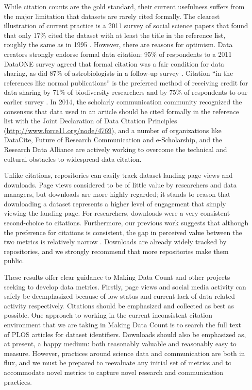 \documentclass[english]{article}
\begin{document}

While citation counts are the gold standard, their current usefulness suffers from the major limitation that datasets are rarely cited formally.
The clearest illustration of current practice is a 2011 survey of social science papers that found that only 17\% cited the dataset with at least the title in the reference list, roughly the same as in 1995 
\cite{sieber_not_1995, mooney_citing_2011}. 
However, there are reasons for optimism.
Data creators strongly endorse formal data citation: 95\% of respondents to a 2011 DataONE survey agreed that formal citation was a fair condition for data sharing, as did 87\% of astrobiologists in a follow-up survey \cite{tenopir_data_2011, aydinoglu_data_2014}. 
Citation ``in the references like normal publications'' is the preferred method of receiving credit for data sharing by 71\% of biodiversity researchers and by 75\% of respondents to our earlier survey \cite{enke_users_2012, kratz_researcher_2015}.
In 2014, the scholarly communication community recognized the consensus that data used in an article should be cited formally in the reference list with the Joint Declaration of Data Citation Principles (\url{http://www.force11.org/node/4769}), and a number of organizations like DataCite, Future of Research Communication and e-Scholarship, and the Research Data Alliance are actively working to overcome the technical and cultural obstacles to widespread data citation.

Unlike citations, repositories can easily track dataset landing page views and downloads.
Page views considered to be of little value by researchers and data managers, but downloads are more highly regarded; it stands to reason that downloading a dataset represents a higher level of engagement that simply viewing the landing page.
For researchers, downloads were a very consistent second-choice to citations.
Furthermore, our previous work suggests that although the preference for citations is consistent, the gap in perceived value between the two metrics is relatively narrow \cite{kratz_researcher_2015}.
Downloads are already widely tracked by repositories, and we strongly recommend that more repositories make them public.

These results offer clear guidance to Making Data Count and other projects seeking to develop data metrics.
Firstly, page views and social media activity can safely be deemphasized because of low status and current lack of data-related activity respectively.
Citations should be emphasized and collected as best as possible.
One approach to working in the current inconsistent citation environment that we are taking in Making Data Count is to search the full text of PLOS articles for dataset identifiers.
Downloads should also be emphasized as, at present, a happy medium: both reasonably valuable and reasonably easy to measure.
However, practices around science data and communication are both in flux, and we must be prepared to reevaluate any initial set of metrics and to accommodate novel metrics to capture novel research and communication practices.
\end{document}
